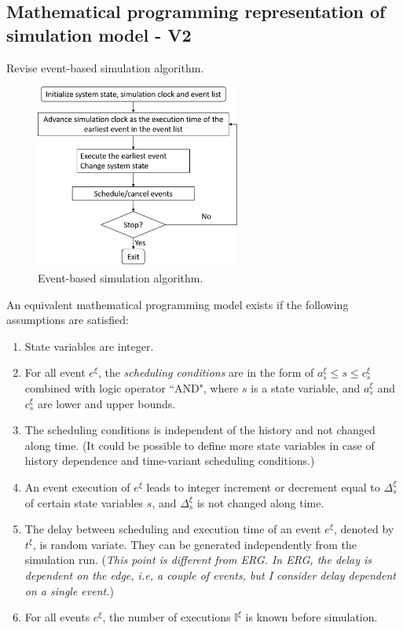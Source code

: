\documentclass[]{interact}
\theoremstyle{plain}%
\theoremstyle{definition}
\theoremstyle{remark}
\begin{document}
\newpage
\subsection{Mathematical programming representation of simulation model - V2}

Revise event-based simulation algorithm.

\begin{figure}[h]
	\centering
	\includegraphics[width=0.6\textwidth]{Figures/EventSimAlgo.png}
	\caption{Event-based simulation algorithm.}
	\label{fig:EventSimAlgo}
\end{figure}

An equivalent mathematical programming model exists if the following assumptions are satisfied:
\begin{enumerate}
	\item State variables are integer.
	\item For all event $e^{\xi}$, the \textit{scheduling conditions} are in the form of $a^{\xi}_s\le s \le c^{\xi}_s$ combined with logic operator ``AND", where $s$ is a state variable, and $a^{\xi}_s$ and $c^{\xi}_s$ are lower and upper bounds.
	\item The scheduling conditions is independent of the history and not changed along time. (It could be possible to define more state variables in case of history dependence and time-variant scheduling conditions.)
	\item An event execution of $e^{\xi}$ leads to integer increment or decrement equal to $\Delta^{\xi}_s$ of certain state variables $s$, and $\Delta^{\xi}_s$ is not changed along time.
	\item The delay between scheduling and execution time of an event $e^{\xi}$, denoted by $t^{\xi}$, is random variate. They can be generated independently from the simulation run. (\textit{This point is different from ERG. In ERG, the delay is dependent on the edge, i.e, a couple of events, but I consider delay dependent on a single event.})
	\item For all events $e^{\xi}$, the number of executions $\mathbb{I}^{\xi}$ is known before simulation.
\end{enumerate}
\end{document}

